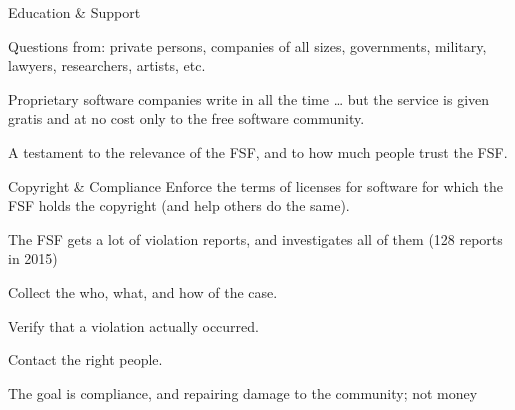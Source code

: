 \documentclass[
  size=12pt,
  style=simple,
  paper=screen
]{powerdot}
\begin{document}
\begin{wideslide}{Education \& Support}
  \begin{itemize}
    \setlength{\itemsep}{1em}

    \nitem Questions from: private persons, companies of all sizes,
    governments, military, lawyers, researchers, artists, etc.

    \pp

    \nitem Proprietary software companies write in all the time \ldots
    \pp but the service is given gratis and at no cost only to the
    free software community.

    \pp

    \nitem A testament to the relevance of the FSF, and to how much
    people trust the FSF.
  \end{itemize}

\end{wideslide}

\begin{wideslide}{Copyright \& Compliance}
  Enforce the terms of licenses for software for which the FSF holds
  the copyright (and help others do the same).

  \pp

  \begin{itemize}
    \setlength{\itemsep}{1em}

    \nitem The FSF gets a lot of violation reports, and investigates
    all of them (128 reports in 2015)

    \pp

    \nitem Collect the who, what, and how of the case.

    \pp

    \nitem Verify that a violation actually occurred.

    \pp

    \nitem Contact the right people.

    \pp

    \nitem The goal is compliance, and repairing damage to the
    community; not money

  \end{itemize}
\end{wideslide}
\end{document}
